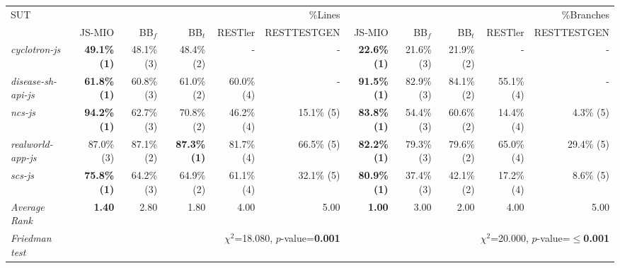 \begin{tabular}{ l r r r r r|r r r r r}\\ 
\toprule 
SUT & \multicolumn{5}{r|}{\%Lines}& \multicolumn{5}{r}{\%Branches}\\ 
 & JS-MIO & BB$_f$ & BB$_t$ & RESTler & RESTTESTGEN & JS-MIO & BB$_f$ & BB$_t$ & RESTler & RESTTESTGEN \\ 
\midrule 
\emph{cyclotron-js} &\textbf{49.1\% (1)} &48.1\% (3) &48.4\% (2) &- &- &\textbf{22.6\% (1)} &21.6\% (3) &21.9\% (2) &- &- \\ 
\emph{disease-sh-api-js} &\textbf{61.8\% (1)} &60.8\% (3) &61.0\% (2) &60.0\% (4) &- &\textbf{91.5\% (1)} &82.9\% (3) &84.1\% (2) &55.1\% (4) &- \\ 
\emph{ncs-js} &\textbf{94.2\% (1)} &62.7\% (3) &70.8\% (2) &46.2\% (4) &15.1\% (5) &\textbf{83.8\% (1)} &54.4\% (3) &60.6\% (2) &14.4\% (4) &4.3\% (5) \\ 
\emph{realworld-app-js} &87.0\% (3) &87.1\% (2) &\textbf{87.3\% (1)} &81.7\% (4) &66.5\% (5) &\textbf{82.2\% (1)} &79.3\% (3) &79.6\% (2) &65.0\% (4) &29.4\% (5) \\ 
\emph{scs-js} &\textbf{75.8\% (1)} &64.2\% (3) &64.9\% (2) &61.1\% (4) &32.1\% (5) &\textbf{80.9\% (1)} &37.4\% (3) &42.1\% (2) &17.2\% (4) &8.6\% (5) \\ 
\midrule 
\emph{Average Rank} & \textbf{1.40} & 2.80 & 1.80 & 4.00 & 5.00 & \textbf{1.00} & 3.00 & 2.00 & 4.00 & 5.00 \\ 
\midrule 
\emph{Friedman test} & \multicolumn{5}{r|}{${\chi}^2$=18.080, $p$-value=\textbf{0.001}} & \multicolumn{5}{r|}{${\chi}^2$=20.000, $p$-value=\textbf{$\le $0.001}} \\ 
\bottomrule 
\end{tabular} 
